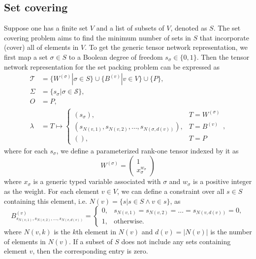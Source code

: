 \documentclass[review, onefignum, onetabnum]{siamart190516}
\begin{document}
\subsection{Set covering}
Suppose one has a finite set $V$ and a list of subsets of $V$, denoted as $S$.
The set covering problem aims to find the minimum number of sets in $S$ that incorporate (cover) all of elements in $V$.
To get the generic tensor network representation, we first map a set $\sigma \in S$ to a Boolean degree of freedom $s_\sigma\in\{0, 1\}$.
Then the tensor network representation for the set packing problem can be expressed as
\begin{equation}\label{eq:covertensornetwork}
\begin{split}
    \mathcal{T} &= \{W^{(\sigma)} | \sigma \in S\} \cup \{B^{(v)} | v \in V\} \cup \{P\},\\
    \Sigma &= \{s_\sigma | \sigma \in \mathcal{S}\},\\
    O &= P,\\
    \lambda &= T \mapsto \begin{cases}
                    (s_\sigma), & T = W^{(\sigma)}\\
                    (s_{N(v, 1)},s_{N(v, 2)},\ldots,s_{N(\sigma, d(v))}), & T = B^{(v)}\\
                    (), & T = P
                    \end{cases},
\end{split}
\end{equation}
where for each $s_\sigma$, we define a parameterized rank-one tensor indexed by it as
\begin{equation}
W^{(\sigma)} = \left(\begin{matrix}
    1 \\
    x_\sigma^{w_\sigma}
    \end{matrix}\right)
\end{equation}
where $x_\sigma$ is a generic typed variable associated with $\sigma$ and $w_\sigma$ is a positive integer as the weight.
For each element $v \in V$, we can define a constraint over all $s \in S$ containing this element, i.e. $N(v) = \{s | s \in S \land v\in s\}$, as
\begin{equation}
B^{(v)}_{s_{N(v, 1)}, s_{N(v, 2)}, \ldots, s_{N(v, d(v))}} = \begin{cases}
    0, & s_{N(v, 1)}=s_{N(v, 2)}=\ldots=s_{N(v, d(v))}=0,\\
    1, & \text{otherwise}.
\end{cases}
\end{equation}
where $N(v, k)$ is the $k$th element in $N(v)$ and $d(v) = |N(v)|$ is the number of elements in $N(v)$. 
If a subset of $S$ does not include any sets containing element $v$, then the corresponding entry is zero.
\end{document}
